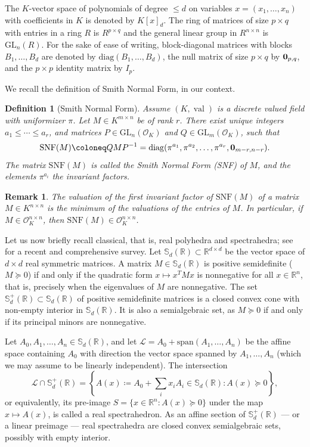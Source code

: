 \documentclass[sigconf]{acmart}
\newcommand{\R}{\mathbb{R}} %
\newcommand{\sym}{\mathbb{S}} %
\renewcommand{\span}[1]{{\mathrm{span}(#1)}} %
\newcommand{\calL}{\mathcal{L}} %
\newtheorem{definition}[theorem]{Definition}
\newtheorem{remark}[theorem]{Remark}
\DeclareMathOperator{\val}{val}
\newcommand{\OK}{\mathcal{O}_K}
\def\diag{\mathrm{diag}}
\newcommand{\GL}{\mathrm{GL}}
\begin{document}
The $K$-vector space of polynomials of degree $\leq d$ on variables
$x=(x_1,\ldots,x_n)$
with coefficients in $K$ is denoted by $K[x]_{d}$. The ring of matrices of
size $p \times q$ with entries in a ring $R$ is $R^{p \times q}$ and the general
linear group in $R^{n \times n}$ is $\GL_n(R)$.
For the sake of ease of writing, block-diagonal matrices with blocks
$B_1,\ldots,B_d$ are denoted by $\diag(B_1, \ldots, B_d)$, the null matrix of
size $p \times q$ by ${\bf 0}_{p,q}$, and the $p \times p$ identity matrix by $I_p$.

We recall the definition of Smith Normal Form, in our context.

\begin{definition}[Smith Normal Form]\label{smith_nf}
  Assume $(K,\val)$ is a discrete valued field with uniformizer $\pi$.
  Let $M \in K^{m \times n}$ be of rank $r$. There exist unique integers
  $a_1 \leq \cdots \leq a_r$, and
  matrices $P \in \GL_n(\OK)$ and $Q \in \GL_m(\OK)$, such that
  $$
  \mathrm{SNF}(M) \coloneq QMP^{-1} = \diag(\pi^{a_1}, \pi^{a_2}, \ldots, \pi^{a_r}, {\bf 0}_{m-r,n-r}).
  $$
  The matrix $\mathrm{SNF}(M)$ is called the \emph{Smith Normal Form (SNF)} of $M$, and the elements $\pi^{a_i}$ the
  \emph{invariant factors}.
\end{definition}
\begin{remark}
  The valuation of the first invariant factor of $\mathrm{SNF}(M)$ of a matrix
  $M \in K^{n \times n}$ is the minimum of the valuations of the entries of
  $M$. In particular, if $M \in \OK^{n \times n}$, then $\mathrm{SNF}(M) \in \OK^{n \times n}$.
\end{remark}

Let us now briefly recall classical, that is, real polyhedra and spectrahedra;
see \cite{netzer2023geometry} for a recent and comprehensive survey.
Let $\sym_d(\R) \subset \R^{d\times d}$ be the vector space of $d \times d$ real symmetric
matrices. A matrix $M \in \sym_d(\R)$ is {positive semidefinite} ($M \succeq 0$) if and only if
 the quadratic form $x \mapsto x^TMx$ is nonnegative for all $x\in \R^n$, that is, precisely when
  the eigenvalues of $M$ are nonnegative. The set $\sym_d^+(\R) \subset \sym_d(\R)$ of positive 
  semidefinite matrices is a closed convex cone with non-empty interior in $\sym_d(\R)$. 
  It is also a semialgebraic set, as $M \succeq 0$ if and only if its principal minors are nonnegative.

Let $A_0,A_1,\ldots,A_n \in \sym_d(\R)$, and let $\calL = A_0+\span{A_1,\ldots,A_n}$ be the affine space
containing $A_0$ with direction the vector space spanned by $A_1,\ldots,A_n$ (which we may assume
to be linearly independent). The intersection
$$
\calL \cap \sym_d^+(\R) = \left\{A(x) \coloneq A_0+\sum_i x_i A_i \in \sym_d(\R) :
A(x) \succeq 0\right\},
$$
or equivalently, its pre-image $S = \{x \in \R^n : A(x) \succeq 0\}$ under the map $x \mapsto A(x)$, is called
a {real spectrahedron}. As an affine section of $\sym_d^+(\R)$ --- or a linear preimage --- real spectrahedra
are closed convex semialgebraic sets, possibly with empty interior.
\end{document}
